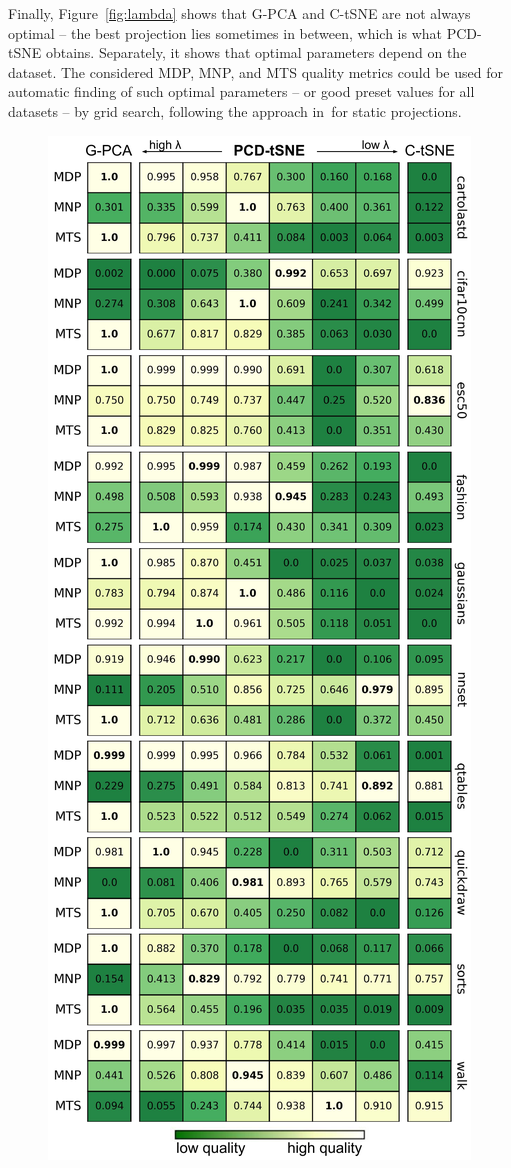 Finally, Figure~\ref{fig:lambda} shows that G-PCA and C-tSNE are not always optimal -- the best projection lies sometimes in between, which is what PCD-tSNE obtains. Separately, it shows that optimal parameters depend on the dataset. The considered MDP, MNP, and MTS quality metrics could be used for automatic finding of such optimal parameters -- or good preset values for all datasets -- by grid search, following the approach in\,\cite{Espadoto19} for static projections.

\begin{figure}[htb!]\centering
 \includegraphics[width=.7\linewidth]{figures/projection-algorithm/lambda-influence-on-metrics.pdf}

\end{figure}
